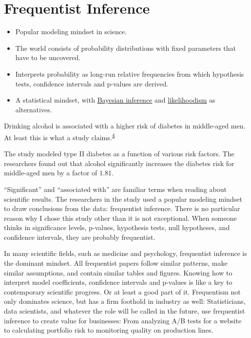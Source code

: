 \documentclass[
  10pt,
]{scrbook}
\providecommand{\tightlist}{%
  \setlength{\itemsep}{0pt}\setlength{\parskip}{0pt}}
\begin{document}
\hypertarget{frequentist-inference}{%
\chapter{Frequentist Inference}\label{frequentist-inference}}

\begin{itemize}
\tightlist
\item
  Popular modeling mindset in science.
\item
  The world consists of probability distributions with fixed parameters that have to be uncovered.
\item
  Interprets probability as long-run relative frequencies from which hypothesis tests, confidence intervals and p-values are derived.
\item
  A statistical mindset, with \protect\hyperlink{bayesian-inference}{Bayesian inference} and \protect\hyperlink{likelihoodism}{likelihoodism} as alternatives.
\end{itemize}

Drinking alcohol is associated with a higher risk of diabetes in middle-aged men.
At least this is what a study claims.\textsuperscript{\protect\hyperlink{ref-kao2001alcohol}{4}}

The study modeled type II diabetes as a function of various risk factors.
The researchers found out that alcohol significantly increases the diabetes risk for middle-aged men by a factor of \(1.81\).

``Significant'' and ``associated with'' are familiar terms when reading about scientific results.
The researchers in the study used a popular modeling mindset to draw conclusions from the data: frequentist inference.
There is no particular reason why I chose this study other than it is not exceptional.
When someone thinks in significance levels, p-values, hypothesis tests, null hypotheses, and confidence intervals, they are probably frequentist.

In many scientific fields, such as medicine and psychology, frequentist inference is the dominant mindset.
All frequentist papers follow similar patterns, make similar assumptions, and contain similar tables and figures.
Knowing how to interpret model coefficients, confidence intervals and p-values is like a key to contemporary scientific progress.
Or at least a good part of it.
Frequentism not only dominates science, but has a firm foothold in industry as well:
Statisticians, data scientists, and whatever the role will be called in the future, use frequentist inference to create value for businesses:
From analyzing A/B tests for a website to calculating portfolio risk to monitoring quality on production lines.
\end{document}
